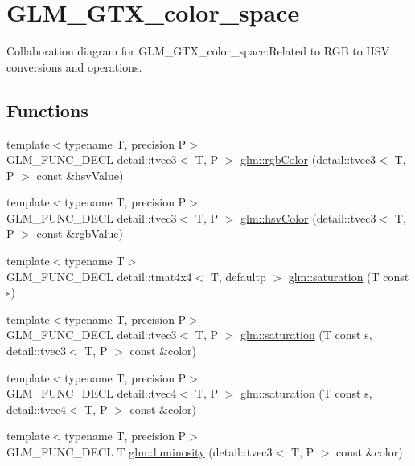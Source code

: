 \hypertarget{group__gtx__color__space}{
\section{GLM\_\-GTX\_\-color\_\-space}
\label{group__gtx__color__space}
}


Collaboration diagram for GLM\_\-GTX\_\-color\_\-space:Related to RGB to HSV conversions and operations.  
\subsection*{Functions}
\begin{CompactItemize}
\item 
{\footnotesize template$<$typename T, precision P$>$ }\\GLM\_\-FUNC\_\-DECL detail::tvec3$<$ T, P $>$ \hyperlink{group__gtx__color__space_g35a9210371395c95b185f5aac6c0020e}{glm::rgbColor} (detail::tvec3$<$ T, P $>$ const \&hsvValue)
\item 
{\footnotesize template$<$typename T, precision P$>$ }\\GLM\_\-FUNC\_\-DECL detail::tvec3$<$ T, P $>$ \hyperlink{group__gtx__color__space_g2532e85174ba333c4f60127d03d71655}{glm::hsvColor} (detail::tvec3$<$ T, P $>$ const \&rgbValue)
\item 
{\footnotesize template$<$typename T$>$ }\\GLM\_\-FUNC\_\-DECL detail::tmat4x4$<$ T, defaultp $>$ \hyperlink{group__gtx__color__space_g53a08c053e194bad0bfc172ef950bfe7}{glm::saturation} (T const s)
\item 
{\footnotesize template$<$typename T, precision P$>$ }\\GLM\_\-FUNC\_\-DECL detail::tvec3$<$ T, P $>$ \hyperlink{group__gtx__color__space_gc45433ff3d2f2f3657edfcf9ee24800d}{glm::saturation} (T const s, detail::tvec3$<$ T, P $>$ const \&color)
\item 
{\footnotesize template$<$typename T, precision P$>$ }\\GLM\_\-FUNC\_\-DECL detail::tvec4$<$ T, P $>$ \hyperlink{group__gtx__color__space_g1ab05270ac2afa8e67b0d268e5c92573}{glm::saturation} (T const s, detail::tvec4$<$ T, P $>$ const \&color)
\item 
{\footnotesize template$<$typename T, precision P$>$ }\\GLM\_\-FUNC\_\-DECL T \hyperlink{group__gtx__color__space_gdd1c8feae48a4fcf9e575648b25b914f}{glm::luminosity} (detail::tvec3$<$ T, P $>$ const \&color)
\end{CompactItemize}


